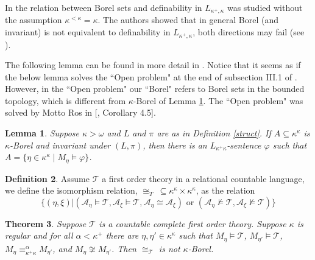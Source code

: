 \documentclass[12pt,a4paper]{amsart}
\newtheorem{thm}{Theorem}[section]
\newtheorem{lemma}[thm]{Lemma}
\theoremstyle{definition}
\newtheorem{defn}[thm]{Definition}
\theoremstyle{remark}
\renewcommand{\mid}{\mathrel{|}\allowbreak}
\begin{document}
In \cite{MR4409720} the relation between Borel sets and definability in $L_{\kappa^+,\kappa}$ was studied without the assumption $\kappa^{<\kappa}=\kappa$. The authors showed that in general Borel (and invariant) is not equivalent to definability in $L_{\kappa^+,\kappa}$, both directions may fail (see \cite[Remarks 8.12 and 8.17]{MR4409720}).

The following lemma can be found in more detail in \cite{MR4409720}. %
Notice that it seems as if the below lemma solves  the ``Open problem" at the end of subsection III.1 of \cite{MR3235820}. However, in the ``Open problem" our ``Borel" refers to Borel sets  in the bounded topology, which is different from $\kappa$-Borel of Lemma \ref{4.2}. The ``Open problem" was solved by Motto Ros in [\cite{MR3093397}, Corollary 4.5].

\begin{lemma}\cite[Proposition 8.13 (a)]{MR4409720}\label{4.2}
    Suppose $\kappa>\omega$ 
    and $L$ and $\pi$ are as in Definition \ref{struct}. If $A\subseteq \kappa^\kappa$ is $\kappa$-Borel and invariant under $(L,\pi)$, then there is an $L_{\kappa^+\kappa}$-sentence $\varphi$ such that $A=\{\eta\in \kappa^\kappa\mid M_\eta\models \varphi\}$.
\end{lemma}

\begin{defn}
Assume $\mathcal{T}$ a first order theory in a relational countable language, we define the isomorphism relation, $\cong_T~\subseteq \kappa^\kappa\times \kappa^\kappa$, as the relation $$\{(\eta,\xi)|(\mathcal{A}_\eta\models \mathcal{T}, \mathcal{A}_\xi\models \mathcal{T}, \mathcal{A}_\eta\cong \mathcal{A}_\xi)\text{ or } (\mathcal{A}_\eta\not\models \mathcal{T}, \mathcal{A}_\xi\not\models \mathcal{T})\}$$
\end{defn}



\begin{thm}\label{iso_borel}
Suppose $\mathcal{T}$ is a countable complete first order theory.
    Suppose $\kappa$ is regular and for all $\alpha<\kappa^+$ there are $\eta,\eta'\in \kappa^\kappa$ such that $M_\eta\models \mathcal{T}$, $M_{\eta'}\models \mathcal{T}$, $M_\eta\equiv^\alpha_{\kappa^+\kappa} M_{\eta'}$, and $M_\eta\not\cong M_{\eta'}$.
    Then $\cong_{\mathcal{T}}$ is not $\kappa$-Borel.%
\end{thm}
\end{document}
